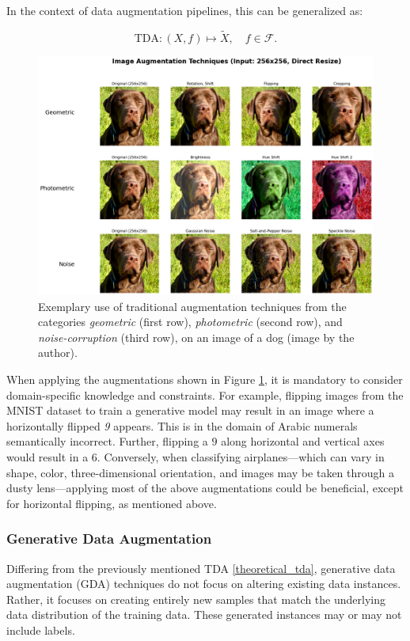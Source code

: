\newpage

\noindent
In the context of data augmentation pipelines, this can be generalized as:

\[
\text{TDA}: (X, f) \mapsto \tilde{X}, \quad f \in \mathcal{F}.
\]

\begin{figure}[htbp]
    \centering
    \includegraphics[width=.9\textwidth]{abb/traditional_image_augmentation_examples__sola.png}
    \caption{Exemplary use of traditional augmentation techniques from the categories \textit{geometric} (first row), \textit{photometric} (second row), and \textit{noise-corruption} (third row), on an image of a dog (image by the author).}
    \label{fig:figure_tda_examples}
\end{figure}

\noindent
When applying the augmentations shown in Figure \ref{fig:figure_tda_examples}, it is mandatory to consider domain-specific knowledge and constraints. For example, flipping images from the MNIST dataset to train a generative model may result in an image where a horizontally flipped \textit{9} appears. This is in the domain of Arabic numerals semantically incorrect. Further, flipping a $9$ along horizontal and vertical axes would result in a $6$. Conversely, when classifying airplanes—which can vary in shape, color, three-dimensional orientation, and images may be taken through a dusty lens—applying most of the above augmentations could be beneficial, except for horizontal flipping, as mentioned above.


\subsubsection[Generative Data Augmentation - GDA]{Generative Data Augmentation}\label{theoretical_gda}
Differing from the previously mentioned TDA \ref{theoretical_tda}, generative data augmentation (GDA) techniques do not focus on altering existing data instances. Rather, it focuses on creating entirely new samples that match the underlying data distribution of the training data. These generated instances may or may not include labels.

